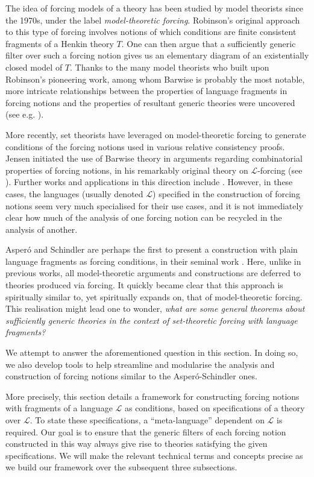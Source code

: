 \documentclass[12pt]{article}
\numberwithin{equation}{section}
\begin{document}
The idea of forcing models of a theory has been studied by model theorists since the 1970s, under the label \emph{model-theoretic forcing}. Robinson's original approach to this type of forcing involves notions of which conditions are finite consistent fragments of a Henkin theory $T$. One can then argue that a sufficiently generic filter over such a forcing notion gives us an elementary diagram of an existentially closed model of $T$. Thanks to the many model theorists who built upon Robinson's pioneering work, among whom Barwise is probably the most notable, more intricate relationships between the properties of language fragments in forcing notions and the properties of resultant generic theories were uncovered (see e.g. \cite{keisler}).

More recently, set theorists have leveraged on model-theoretic forcing to generate conditions of the forcing notions used in various relative consistency proofs. Jensen initiated the use of Barwise theory in arguments regarding combinatorial properties of forcing notions, in his remarkably original theory on $\mathcal{L}$-forcing (see \cite{lforcing}). Further works and applications in this direction include \cite{doebler}. However, in these cases, the languages (usually denoted $\mathcal{L}$) specified in the construction of forcing notions seem very much specialised for their use cases, and it is not immediately clear how much of the analysis of one forcing notion can be recycled in the analysis of another. 

Asper\'{o} and Schindler are perhaps the first to present a construction with plain language fragments as forcing conditions, in their seminal work \cite{schindler}. Here, unlike in previous works, all model-theoretic arguments and constructions are deferred to theories produced via forcing. It quickly became clear that this approach is spiritually similar to, yet spiritually expands on, that of model-theoretic forcing. This realisation might lead one to wonder, \textit{what are some general theorems about sufficiently generic theories in the context of set-theoretic forcing with language fragments?}

We attempt to answer the aforementioned question in this section. In doing so, we also develop tools to help streamline and modularise the analysis and construction of forcing notions similar to the Asper\'{o}-Schindler ones.

More precisely, this section details a framework for constructing forcing notions with fragments of a language $\mathcal{L}$ as conditions, based on specifications of a theory over $\mathcal{L}$. To state these specifications, a ``meta-language'' dependent on $\mathcal{L}$ is required. Our goal is to ensure that the generic filters of each forcing notion constructed in this way always give rise to theories satisfying the given specifications. We will make the relevant technical terms and concepts precise as we build our framework over the subsequent three subsections.
\end{document}
